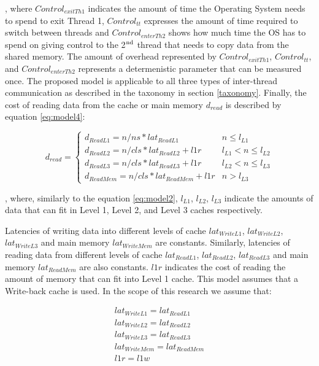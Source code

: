 , where $Control_{exitTh1}$ indicates the amount of time the Operating System needs to spend to exit Thread 1, $Control_{tt}$ expresses the amount of time required to switch between threads and $Control_{enterTh2}$ shows how much time the OS has to spend on giving control to the 2$^{\textnormal{nd}}$ thread that needs to copy data from the shared memory. The amount of overhead represented by $Control_{exitTh1}$, $Control_{tt}$, and $Control_{enterTh2}$ represents a determenistic parameter that can be measured once. The proposed model is applicable to all three types of inter-thread communication as described in the taxonomy in section \ref{taxonomy}. Finally, the cost of reading data from the cache or main memory $d_{read}$ is described by equation \eqref{eq:model4}:

\begin{equation}\label{eq:model4}
d_{read} = \begin{cases}d_{ReadL1}= n/ns * lat_{ReadL1} & n \leq l_{L1}\\d_{ReadL2} = n/cls * lat_{ReadL2} + l1r & l_{L1} < n \leq l_{L2}\\d_{ReadL3} = n/cls * lat_{ReadL3} + l1r & l_{L2} < n \leq l_{L3}\\d_{ReadMem} = n/cls * lat_{ReadMem} + l1r & n > l_{L3}\end{cases}
\end{equation}

, where, similarly to the equation \ref{eq:model2}, $l_{L1}$, $l_{L2}$, $l_{L3}$ indicate the amounts of data that can fit in Level 1, Level 2, and Level 3 caches respectively.

Latencies of writing data into different levels of cache $lat_{WriteL1}$, $lat_{WriteL2}$, $lat_{WriteL3}$ and main memory $lat_{WriteMem}$ are constants. Similarly, latencies of reading data from different levels of cache $lat_{ReadL1}$, $lat_{ReadL2}$, $lat_{ReadL3}$ and main memory $lat_{ReadMem}$ are also constants. $l1r$ indicates the cost of reading the amount of memory that can fit into Level 1 cache. This model assumes that a Write-back cache is used. In the scope of this research we assume that:

\begin{equation}\label{eq:model5}
\begin{split}
lat_{WriteL1} = lat_{ReadL1} \\
lat_{WriteL2} = lat_{ReadL2} \\
lat_{WriteL3} = lat_{ReadL3} \\
lat_{WriteMem} = lat_{ReadMem} \\
l1r = l1w \\
\end{split}
\end{equation}

